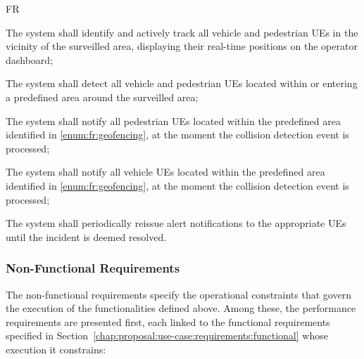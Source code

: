 \begin{custenumerate}{FR}
    \item \label{enum:fr:ue-tracking} The system shall identify and actively track all vehicle and pedestrian \acsp{UE} in the vicinity of the surveilled area, displaying their real-time positions on the operator dashboard;
    \item \label{enum:fr:geofencing} The system shall detect all vehicle and pedestrian \acsp{UE} located within or entering a predefined area around the surveilled area;
    \item \label{enum:fr:notify-pedestrians} The system shall notify all pedestrian \acsp{UE} located within the predefined area identified in \ref{enum:fr:geofencing}, at the moment the collision detection event is processed;
    \item \label{enum:fr:notify-vehicles} The system shall notify all vehicle \acsp{UE} located within the predefined area identified in \ref{enum:fr:geofencing}, at the moment the collision detection event is processed;
    \item \label{enum:fr:notify-periodic} The system shall periodically reissue alert notifications to the appropriate \acsp{UE} until the incident is deemed resolved.
\end{custenumerate}

\subsubsection{Non-Functional Requirements}
\label{chap:proposal:use-case:requirements:nonfunctional}

The non-functional requirements specify the operational constraints that govern the execution of the functionalities defined above. Among these, the performance requirements are presented first, each linked to the functional requirements specified in Section~\ref{chap:proposal:use-case:requirements:functional} whose execution it constrains:

